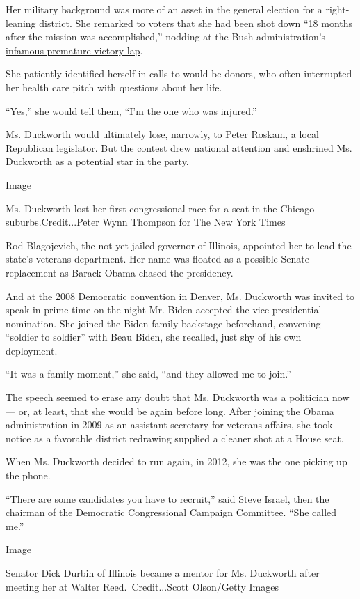 Her military background was more of an asset in the general election for
a right-leaning district. She remarked to voters that she had been shot
down ``18 months after the mission was accomplished,'' nodding at the
Bush administration's
\href{https://www.nytimes3xbfgragh.onion/2003/10/29/world/bush-steps-away-from-victory-banner.html}{infamous
premature victory lap}.

She patiently identified herself in calls to would-be donors, who often
interrupted her health care pitch with questions about her life.

``Yes,'' she would tell them, ``I'm the one who was injured.''

Ms. Duckworth would ultimately lose, narrowly, to Peter Roskam, a local
Republican legislator. But the contest drew national attention and
enshrined Ms. Duckworth as a potential star in the party.

Image

Ms. Duckworth lost her first congressional race for a seat in the
Chicago suburbs.Credit...Peter Wynn Thompson for The New York Times

Rod Blagojevich, the not-yet-jailed governor of Illinois, appointed her
to lead the state's veterans department. Her name was floated as a
possible Senate replacement as Barack Obama chased the presidency.

And at the 2008 Democratic convention in Denver, Ms. Duckworth was
invited to speak in prime time on the night Mr. Biden accepted the
vice-presidential nomination. She joined the Biden family backstage
beforehand, convening ``soldier to soldier'' with Beau Biden, she
recalled, just shy of his own deployment.

``It was a family moment,'' she said, ``and they allowed me to join.''

The speech seemed to erase any doubt that Ms. Duckworth was a politician
now --- or, at least, that she would be again before long. After joining
the Obama administration in 2009 as an assistant secretary for veterans
affairs, she took notice as a favorable district redrawing supplied a
cleaner shot at a House seat.

When Ms. Duckworth decided to run again, in 2012, she was the one
picking up the phone.

``There are some candidates you have to recruit,'' said Steve Israel,
then the chairman of the Democratic Congressional Campaign Committee.
``She called me.''

Image

Senator Dick Durbin of Illinois became a mentor for Ms. Duckworth after
meeting her at Walter Reed.~Credit...Scott Olson/Getty Images


